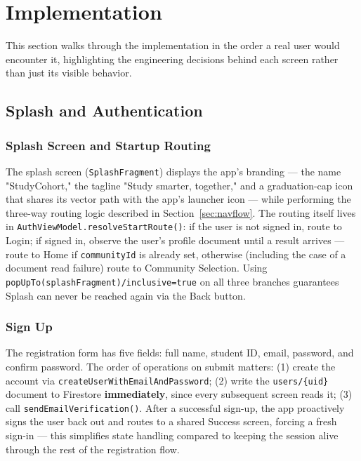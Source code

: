 \section{Implementation}

This section walks through the implementation in the order a real user would encounter it, highlighting the engineering decisions behind each screen rather than just its visible behavior.

\subsection{Splash and Authentication}

\subsubsection{Splash Screen and Startup Routing}

The splash screen (\texttt{SplashFragment}) displays the app's branding — the name "StudyCohort," the tagline "Study smarter, together," and a graduation-cap icon that shares its vector path with the app's launcher icon — while performing the three-way routing logic described in Section~\ref{sec:navflow}. The routing itself lives in \texttt{AuthViewModel.resolveStartRoute()}: if the user is not signed in, route to Login; if signed in, observe the user's profile document until a result arrives — route to Home if \texttt{communityId} is already set, otherwise (including the case of a document read failure) route to Community Selection. Using \texttt{popUpTo(splashFragment)/inclusive=true} on all three branches guarantees Splash can never be reached again via the Back button.

\subsubsection{Sign Up}

The registration form has five fields: full name, student ID, email, password, and confirm password. The order of operations on submit matters: (1) create the account via \texttt{createUserWithEmailAndPassword}; (2) write the \texttt{users/\{uid\}} document to Firestore \textbf{immediately}, since every subsequent screen reads it; (3) call \texttt{sendEmailVerification()}. After a successful sign-up, the app proactively signs the user back out and routes to a shared Success screen, forcing a fresh sign-in — this simplifies state handling compared to keeping the session alive through the rest of the registration flow.

